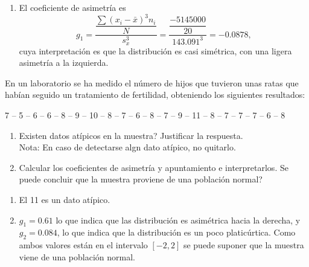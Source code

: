 {\begin{enumerate}
De la misma forma pero procediendo con una frecuencia acumulada $3n/4=15$ para $C_{3}$, lo cual indica que se encuentra en el intervalo
$\left[ 1300,1400\right)$:%
\[
\dfrac{16-11}{1400-1300}=\dfrac{15-11}{C_{3}-1300} \Leftrightarrow C_{3}=1380\text{ kcal}.
\]

Por lo tanto el rango intercuartílico vale $RI=C_{3}-C_{1}=1380-1125=255\text{ kcal,}$
\]
cuya interpretación es que entre 1125 kcal y 1380 kcal se encuentran el 50\% de los individuos de la muestra que comen una cantidad media de
kilocalorías (lejos de los ``excesos'' del 25\% que más kilocalorías toman, o de los ``defectos'' del 25\% que menos kilocalorías
ingieren). Se puede observar, así mismo, que estos datos centrales no están muy dispersos.

\item El coeficiente de asimetría es
\[
g_{1}=\dfrac{\dfrac{\sum \left( x_{i}-\bar x\right) ^{3}n_{i}}{N}}{s_{x}^{3}}=\dfrac{\dfrac{-5145000}{20}}{143.091^{3}}=-0.0878,
\]
cuya interpretación es que la distribución es casi simétrica, con una ligera asimetría a la izquierda.
\end{enumerate}
}


{En un laboratorio se ha medido el número de hijos que tuvieron unas ratas que habían seguido un tratamiento de fertilidad, obteniendo los
siguientes resultados:
\begin{center}
7 -- 5 -- 6 -- 6 -- 8 -- 9 -- 10 -- 8 -- 7 -- 6 -- 8 -- 7 -- 9 -- 11 -- 8 -- 7 -- 7 -- 7 -- 6 -- 8
\end{center}

\begin{enumerate}
\item Existen datos atípicos en la muestra? Justificar la respuesta.\\
Nota: En caso de detectarse algn dato atípico, no quitarlo.
\item Calcular los coeficientes de asimetría y apuntamiento e interpretarlos. Se puede concluir que la muestra proviene de una población
normal?
\end{enumerate}
}
{\begin{enumerate}
\item El 11 es un dato atípico.
\item $g_1=0.61$ lo que indica que las distribución es asimétrica hacia la derecha, y $g_2=0.084$, lo que indica que la distribución es un
poco platicúrtica. Como ambos valores están en el intervalo $[-2,2]$ se puede suponer que la muestra viene de una población normal.
\end{enumerate}
}
{}


